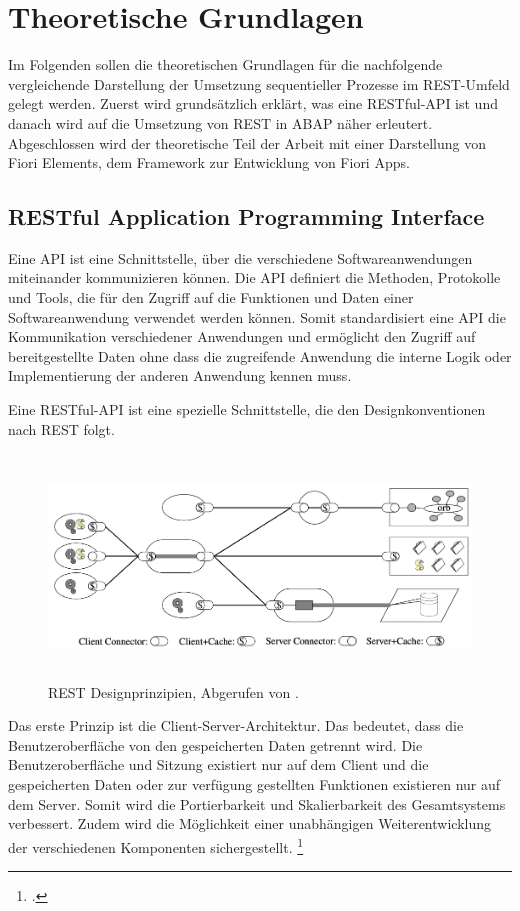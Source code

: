 \chapter{Theoretische Grundlagen}

Im Folgenden sollen die theoretischen Grundlagen für die nachfolgende vergleichende Darstellung der Umsetzung sequentieller Prozesse im REST-Umfeld gelegt werden. Zuerst wird grundsätzlich erklärt, was eine RESTful-API ist und danach wird auf die Umsetzung von REST in ABAP näher erleutert. Abgeschlossen wird der theoretische Teil der Arbeit mit einer Darstellung von Fiori Elements, dem Framework zur Entwicklung von Fiori Apps.

\section{RESTful Application Programming Interface}

Eine API ist eine Schnittstelle, über die verschiedene Softwareanwendungen miteinander kommunizieren können. Die API definiert die Methoden, Protokolle und Tools, die für den Zugriff auf die Funktionen und Daten einer Softwareanwendung verwendet werden können. Somit standardisiert eine API die Kommunikation verschiedener Anwendungen und ermöglicht den Zugriff auf bereitgestellte Daten ohne dass die zugreifende Anwendung die interne Logik oder Implementierung der anderen Anwendung kennen muss.

Eine RESTful-API ist eine spezielle Schnittstelle, die den Designkonventionen nach REST folgt.

\begin{figure}[H]
    \centering
    \includegraphics[height=5.95cm]{Bilder/REST_Rest.png}
    \caption[REST Designprinzipien]{REST Designprinzipien, Abgerufen von \cite{fielding_architectural_2000}.}
    \label{fig:iso_norm}
\end{figure}

Das erste Prinzip ist die Client-Server-Architektur. Das bedeutet, dass die Benutzeroberfläche von den gespeicherten Daten getrennt wird. Die Benutzeroberfläche und Sitzung existiert nur auf dem Client und die gespeicherten Daten oder zur verfügung gestellten Funktionen existieren nur auf dem Server. Somit wird die Portierbarkeit und Skalierbarkeit des Gesamtsystems verbessert. Zudem wird die Möglichkeit einer unabhängigen Weiterentwicklung der verschiedenen Komponenten sichergestellt. \footcite[Vgl.][]{fielding_architectural_2000}

